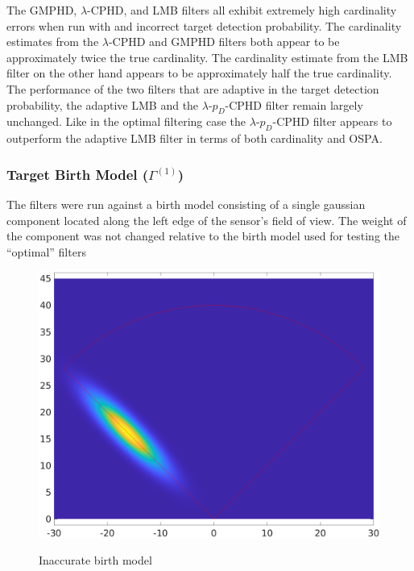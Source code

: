 \documentclass{article}
\newcommand{\lcphd}{$\lambda$-CPHD}
\newcommand{\lpdcphd}{$\lambda$-$p_D$-CPHD}
\begin{document}
The GMPHD, $\lambda$-CPHD, and LMB filters all exhibit extremely high cardinality errors when run with and incorrect target detection probability. The cardinality estimates from the \lcphd{} and GMPHD filters both appear to be approximately twice the true cardinality. The cardinality estimate from the LMB filter on the other hand appears to be approximately half the true cardinality. The performance of the two filters that are adaptive in the target detection probability, the adaptive LMB and the \lpdcphd{} filter remain largely unchanged. Like in the optimal filtering case the \lpdcphd{} filter appears to outperform the adaptive LMB filter in terms of both cardinality and OSPA.

\subsubsection{Target Birth Model ($\Gamma^{(1)}$)}
The filters were run against a birth model consisting of a single gaussian component located along the left edge of the sensor's field of view. The weight of the component was not changed relative to the birth model used for testing the ``optimal'' filters
\begin{figure}[H]
  \centering
  \includegraphics[width=.75\linewidth]{bad_birth/bm.png}
  \label{fig:birth_model}
  \caption{Inaccurate birth model}
\end{figure}
\end{document}
